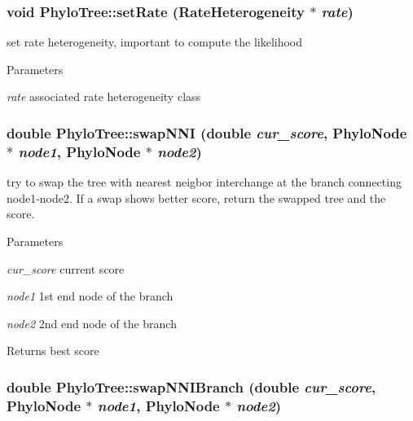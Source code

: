 \hypertarget{classPhyloTree_ad25ae1a621d627f255d9cd8563675165}{
\subsubsection[{setRate}]{\setlength{\rightskip}{0pt plus 5cm}void PhyloTree::setRate ({\bf RateHeterogeneity} $\ast$ {\em rate})}}
\label{classPhyloTree_ad25ae1a621d627f255d9cd8563675165}
set rate heterogeneity, important to compute the likelihood 
\begin{DoxyParams}{Parameters}
\item[{\em rate}]associated rate heterogeneity class \end{DoxyParams}
\hypertarget{classPhyloTree_ad5019f595c9fe481d3eb326bcf10fb03}{
\subsubsection[{swapNNI}]{\setlength{\rightskip}{0pt plus 5cm}double PhyloTree::swapNNI (double {\em cur\_\-score}, \/  {\bf PhyloNode} $\ast$ {\em node1}, \/  {\bf PhyloNode} $\ast$ {\em node2})}}
\label{classPhyloTree_ad5019f595c9fe481d3eb326bcf10fb03}
try to swap the tree with nearest neigbor interchange at the branch connecting node1-\/node2. If a swap shows better score, return the swapped tree and the score. 
\begin{DoxyParams}{Parameters}
\item[{\em cur\_\-score}]current score \item[{\em node1}]1st end node of the branch \item[{\em node2}]2nd end node of the branch \end{DoxyParams}
\begin{DoxyReturn}{Returns}
best score 
\end{DoxyReturn}
\hypertarget{classPhyloTree_ab846b2730dd57366d4d5c8412870cd9a}{
\subsubsection[{swapNNIBranch}]{\setlength{\rightskip}{0pt plus 5cm}double PhyloTree::swapNNIBranch (double {\em cur\_\-score}, \/  {\bf PhyloNode} $\ast$ {\em node1}, \/  {\bf PhyloNode} $\ast$ {\em node2})}}
\label{classPhyloTree_ab846b2730dd57366d4d5c8412870cd9a}
